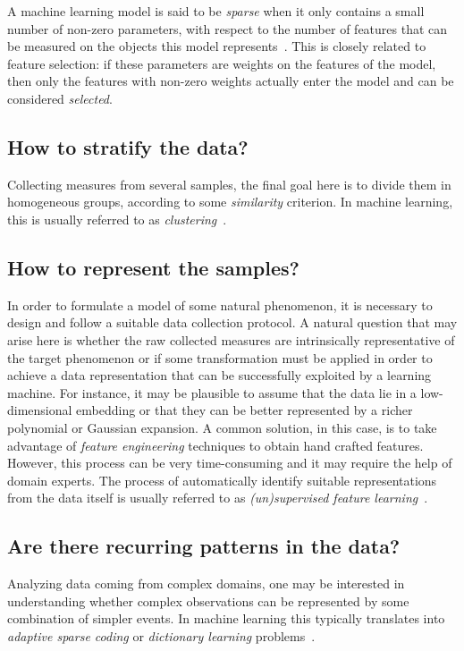 A machine learning model is said to be \textit{sparse} when it only contains a small number of non-zero parameters, with respect to the number of features that can be measured on the objects this model represents~\cite{hastie2015statistical, meier2008group}. This is closely related to feature selection: if these parameters are weights on the features of the model, then only the features with non-zero weights actually enter the model and can be considered \textit{selected}.

\subsection{How to stratify the data?} %
Collecting measures from several samples, the final goal here is to divide them in homogeneous groups, according to some \textit{similarity} criterion. In machine learning, this is usually referred to as \textit{clustering}~\cite{hastie2009elements}.

\subsection{How to represent the samples?} %
In order to formulate a model of some natural phenomenon, it is necessary to design and follow a suitable data collection protocol. A natural question that may arise here is whether the raw collected measures are intrinsically representative of the target phenomenon or if some transformation must be applied in order to achieve a data representation that can be successfully exploited by a learning machine. For instance, it may be plausible to assume that the data lie in a low-dimensional embedding or that they can be better represented by a richer polynomial or Gaussian expansion.
A common solution, in this case, is to take advantage of \textit{feature engineering} techniques to obtain hand crafted features. However, this process can be very time-consuming and it may require the help of domain experts. The process of automatically identify suitable representations from the data itself is usually referred to as \textit{(un)supervised feature learning}~\cite{angermueller2016deep, mamoshina2016applications}.

\subsection{Are there recurring patterns in the data? } %
Analyzing data coming from complex domains, one may be interested in understanding whether complex observations can be represented by some combination of simpler events. In machine learning this typically translates into \textit{adaptive sparse coding} or \textit{dictionary learning} problems~\cite{masecchia2015genome, alexandrov2013signatures}.


